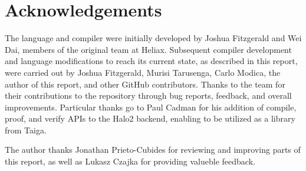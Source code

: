 \documentclass[
    9pt,            
    techreport,       
    affiltop,       
]{art}
\begin{document}
\section{Acknowledgements}

The \VampIR{} language and compiler were initially developed by Joshua Fitzgerald and Wei Dai, members of the original \VampIR{} team at Heliax. Subsequent compiler development and language modifications to reach its current state, as described in this report, were carried out by Joshua Fitzgerald, Murisi Tarusenga, Carlo Modica, the author of this report, and other GitHub contributors. Thanks to the \Juvix{} team for their contributions to the \VampIR{} repository through bug reports, feedback, and overall improvements. Particular thanks go to Paul Cadman for his addition of compile, proof, and verify APIs to the Halo2 backend, enabling \VampIR{} to be utilized as a library from Taiga.

\noindent The author thanks Jonathan Prieto-Cubides for reviewing and improving parts of this report, as well as Lukasz Czajka for providing valueble feedback.



\end{document}
